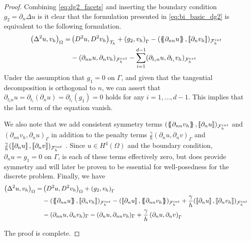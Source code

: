 \begin{proof}
Combining \eqref{eq:dg2_facets} and inserting the boundary condition $g_{2} = \partial _{n} \Delta u $ is it clear that the formulation presented in \eqref{eq:bi_basic_dg2} is equivalent to the following formulation.
\begin{equation}
\label{eq:bi_basic_dg_full_1}
\begin{split}
    \left( \Delta  ^{2} u, v_h \right) _{\Omega }  =&   \left( D^2u, D^2v_h \right)_{\mathcal{T} _{h}} +  \left(g_{2}, v_h  \right) _{\Gamma  }  -  ( \left\{\!\!\left\{ \partial _{nn} u \right\}\!\!\right\}   , \left[\!\left[  \partial_{n} v_h  \right]\!\right] )_{\mathcal{F}_{h}^{int} } \\
                                                  &  - ( \partial _{nn} u , \partial _{n} v_h)_{\mathcal{F}^{ext}_{h} } - \sum_{i =1  }^{d-1} ( \partial   _{t_{i}n} u  ,  \partial   _{t_{i}}  v_h  )_{ \mathcal{F}^{ext} _{h}  }
\end{split}
\end{equation}
Under the assumption that $g_{1} = 0$ on $\Gamma$, and given that the tangential decomposition is orthogonal to $n$, we can assert that $ \partial_{t_{i} n} u = \partial_{t_{i}} ( \partial _{n} u )= \partial_{t_{i}} ( g_{1} ) = 0 $ holds for any $i =
1,\ldots, d -1$. This implies that the
last term of the equation vanish.

We also note that we add consistent symmetry terms $( \left\{\!\!\left\{ \partial _{nn} v_h \right\}\!\!\right\} ,\left[\!\left[  \partial _{n} u  \right]\!\right]    )_{\mathcal{F}^{int}_{h} } $ and $( \partial _{nn} v_h  , \partial _{n} u     )_{\Gamma  } $ in addition to the penalty terms $\frac{\gamma
}{h} ( \partial _{n} u, \partial _{n}v)_{\Gamma }  $ and $\frac{\gamma
}{h} ( \left[\!\left[  \partial _{n} u  \right]\!\right]  , \left[\!\left[     \partial _{n}v \right]\!\right])_{\mathcal{F}^{int}_{h} }  $ . Since $u\in H^{4}( \Omega ) $ and the boundary condition,  $\partial _{n} u = g_{1}=0$ on $\Gamma $, is each of these terms effectively zero, but does provide symmetry and will later
be proven to be essential for well-posedness for the discrete problem. Finally, we have
\begin{equation}
\begin{split}
    \left( \Delta  ^{2} u, v_h \right) _{\Omega }  =&   \left( D^2u, D^2v_h \right)_{\Omega } + \left(g_{2}, v_h  \right) _{ \Gamma  }\\
    &    -  ( \mean{ \partial _{nn} u }   , \jump{ \partial_{n} v_h } )_{\mathcal{F}_{h}^{int} } -  (  \jump{ \partial_{n} u
    },\mean{ \partial _{nn} v_h } )_{\mathcal{F}_{h}^{int} } + \frac{\gamma }{h}  (  \jump{ \partial_{n} u },\jump{ \partial _{n} v_h } )_{\mathcal{F}_{h}^{int} } \\
    & - ( \partial _{nn} u , \partial _{n} v_h)_{\Gamma  } - (\partial _{n} u, \partial _{nn} v_h )_{\Gamma  }  + \frac{\gamma }{h}  \left(  \partial _{n} u,  \partial _{n} v      \right)_{\Gamma }
\end{split}
\end{equation}

The proof is complete.

\end{proof}

